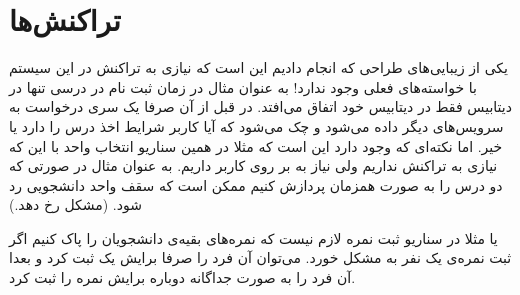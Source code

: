 \section{تراکنش‌ها}
یکی از زیبایی‌های طراحی که انجام دادیم این است که نیازی به تراکنش در این سیستم با خواسته‌های
فعلی وجود ندارد! به عنوان مثال در زمان ثبت نام در درسی تنها
در دیتابیس فقط در دیتابیس خود
اتفاق می‌افتد. در قبل از آن صرفا یک سری درخواست به سرویس‌های دیگر داده می‌شود و چک می‌شود که آیا
کاربر شرایط اخذ درس را دارد یا خیر. اما نکته‌ای که وجود دارد این است که مثلا در همین سناریو انتخاب
واحد با این که نیازی به تراکنش نداریم ولی نیاز به
بر روی کاربر داریم. به عنوان مثال در صورتی که دو درس را به صورت همزمان پردازش کنیم ممکن
است که سقف واحد دانشجویی رد شود.
(مشکل  رخ دهد.)

یا مثلا در سناریو ثبت نمره لازم نیست که نمره‌های بقیه‌ی دانشجویان را پاک کنیم اگر ثبت نمره‌ی یک نفر
به مشکل خورد. می‌توان آن فرد را صرفا برایش یک
ثبت کرد و بعدا آن فرد را به صورت جداگانه دوباره برایش نمره را ثبت کرد.